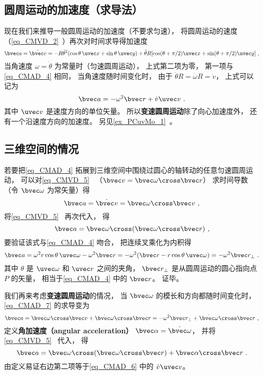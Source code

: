 \subsection{圆周运动的加速度（求导法）}\label{sub_CMAD_1}
现在我们来推导一般圆周运动的加速度（不要求匀速），  将圆周运动的速度（\autoref{eq_CMVD_2}~）再次对时间求导得加速度
\begin{equation}
\bvec a = \dot {\bvec v} =  - R \dot\theta^2(\cos \theta\, \uvec x + \sin \theta\, \uvec y) + \ddot\theta R [\cos(\theta + \pi/2) \uvec x + \sin(\theta + \pi/2)\uvec y]~,
\end{equation}
当角速度 $\omega = \dot\theta$ 为常量时（匀速圆周运动）， 上式第二项为零， 第一项与\autoref{eq_CMAD_4} 相同， 当角速度随时间变化时， 由于 $\ddot\theta R = \dot\omega R = \dot v$， 上式可以记为
\begin{equation}\label{eq_CMAD_6}
\bvec a = - \omega ^2 \bvec r + \dot v \uvec v~.
\end{equation}
其中 $\uvec v$ 是速度方向的单位矢量。 所以\textbf{变速圆周运动}除了向心加速度外， 还有一个沿速度方向的加速度。 另见\autoref{ex_PCuvMo_1}~。

\subsection{三维空间的情况}
若要把\autoref{eq_CMAD_4} 拓展到三维空间中围绕过圆心的轴转动的任意匀速圆周运动， 可以对\autoref{eq_CMVD_5}~ （$\bvec v = \bvec\omega \cross \bvec r$） 求时间导数（令 $\bvec\omega$ 为常矢量）得
\begin{equation}\label{eq_CMAD_7}
\bvec a = \dot{\bvec v} = \bvec\omega \cross \bvec v~,
\end{equation}
将\autoref{eq_CMVD_5}~ 再次代入， 得
\begin{equation}\label{eq_CMAD_9}
\bvec a =  \bvec\omega \cross (\bvec\omega \cross \bvec r)~,
\end{equation}
要验证该式与\autoref{eq_CMAD_4} 吻合， 把连续叉乘化为内积得
\begin{equation}
\bvec a = \omega^2 r \cos\theta\, \uvec \omega - \omega^2 \bvec r = -\omega^2 (\bvec r - r\cos\theta\, \uvec\omega) = -\omega^2 \bvec r_\bot~.
\end{equation}
其中 $\theta$ 是 $\uvec\omega$ 和 $\uvec r$ 之间的夹角， $\bvec r_\bot$ 是从圆周运动的圆心指向点 $P$ 的矢量， 相当于\autoref{eq_CMAD_4} 中的 $\bvec r$。 证毕。

我们再来考虑\textbf{变速圆周运动}的情况， 当 $\bvec\omega$ 的模长和方向都随时间变化时， \autoref{eq_CMAD_7} 的求导变为
\begin{equation}
\bvec a = \bvec\omega \cross \bvec v + \dot{\bvec\omega} \cross \bvec r = -\omega^2 \bvec r_\bot + \dot{\bvec\omega} \cross \bvec r~,
\end{equation}
定义\textbf{角加速度（angular acceleration）} $\bvec\alpha = \dot{\bvec\omega}$， 并将\autoref{eq_CMVD_5}~ 代入， 得
\begin{equation}\label{eq_CMAD_1}
\bvec a =  \bvec\omega \cross (\bvec\omega \cross \bvec r) + \bvec\alpha\cross\bvec r~.
\end{equation}
由定义易证右边第二项等于\autoref{eq_CMAD_6} 中的 $\dot v\uvec v$。
